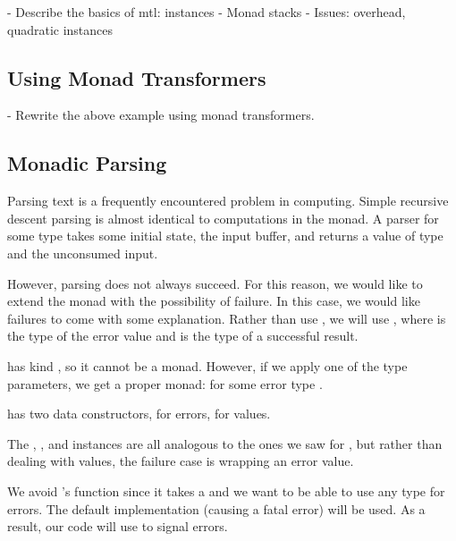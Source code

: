 - Describe the basics of mtl: instances
- Monad stacks
- Issues: overhead, quadratic instances

\subsection{Using Monad Transformers}

- Rewrite the above example using monad transformers.

\subsection{Monadic Parsing}

Parsing text is a frequently encountered problem in computing. Simple recursive descent parsing is almost
identical to computations in the  monad. A parser for some type  takes some initial 
state, the input buffer, and returns a value of type  and the unconsumed input.

However, parsing does not always succeed. For this reason, we would like to extend the  monad
with the possibility of failure. In this case, we would like failures to come with some explanation. Rather
than use , we will use , where  is the type of the error value and
 is the type of a successful result.

 has kind \code{* -> * -> *}, so it cannot be a monad. However, if we apply one of the type
parameters, we get a proper monad:  for some error type .



\begin{notelist}
    \item {} has two data constructors,  for errors,  for values.
    \item The , , and  instances are all analogous to the ones we
          saw for , but rather than dealing with  values, the failure case is  
          wrapping an error value.
    \item We avoid 's  function since it takes a  and we want to be able
          to use any type for errors. The default implementation (causing a fatal error) will be used. As a result,
          our code will use  to signal errors.
\end{notelist}

